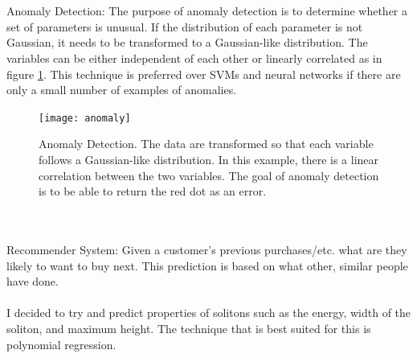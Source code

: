 \documentclass[a4paper,12pt]{report}
\begin{document}
\\\\
Anomaly Detection: The purpose of anomaly detection is to determine whether a set of parameters is unusual. If the distribution of each parameter is not Gaussian, it needs to be transformed to a Gaussian-like distribution. The variables can be either independent of each other or linearly correlated as in figure \ref{anomaly}. This technique is preferred over SVMs and neural networks if there are only a small number of examples of anomalies.
\begin{figure}[h]
\centering
\texttt{[image: anomaly]}
\caption{Anomaly Detection. The data are transformed so that each variable follows a Gaussian-like distribution. In this example, there is a linear correlation between the two variables. The goal of anomaly detection is to be able to return the red dot as an error.}
\label{anomaly} 
\end{figure}
\\\\
Recommender System: Given a customer's previous purchases/etc. what are they likely to want to buy next. This prediction is based on what other, similar people have done.
\\\\
I decided to try and predict properties of solitons such as the energy, width of the soliton, and maximum height. The technique that is best suited for this is polynomial regression. 
\end{document}

